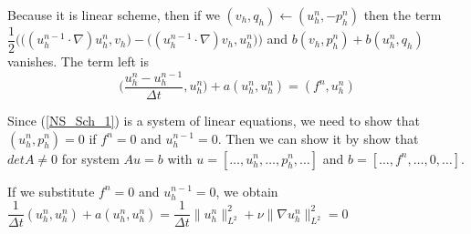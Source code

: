 \documentclass[a4paper,10pt]{article}
\begin{document}
Because it is linear scheme, then if we $ (v_{h},q_{h}) \leftarrow (u_{h}^{n},-p_{h}^{n}) $ then the term \\ $ \dfrac{1}{2} \Big( \big((u_{h}^{n-1} \cdot \nabla)u_{h}^{n},v_{h}\big) - \big((u_{h}^{n-1} \cdot \nabla)v_{h},u_{h}^{n}\big) \Big) $ and $ b(v_{h},p_{h}^{n}) + b(u_{h}^{n},q_{h}) $ vanishes. The term left is
\[ \big( \dfrac{u_{h}^{n}-u_{h}^{n-1}}{\Delta t},u_{h}^{n}\big) + a(u_{h}^{n},u_{h}^{n}) = (f^{n},u_{h}^{n}) \]

Since (\ref{NS_Sch_1}) is a system of linear equations, we need to show that $ (u_{h}^{n}, p_{h}^{n}) = 0 $ if $ f^{n} = 0 $ and $ u_{h}^{n-1}=0 $. Then we can show it by show that $ det A \neq 0 $ for system $ Au=b $ with $ u = [\dots, u_{h}^{n}, \dots , p_{h}^{n}, \dots] $ and $ b =[\dots, f^{n}, \dots, 0, \dots] $.

If we substitute $ f^{n} = 0 $ and $ u_{h}^{n-1}=0 $, we obtain $ \dfrac{1}{\Delta t}(u_{h}^{n},u_{h}^{n}) + a(u_{h}^{n},u_{h}^{n}) = \dfrac{1}{\Delta t} \|u_{h}^{n}\|_{L^2}^{2} + \nu \| \nabla u_{h}^{n}\|_{L^2}^{2} = 0 $
\end{document}
